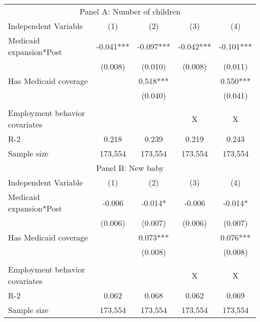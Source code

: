 \begin{tabular}{lcccc}
\toprule
\toprule
 \multicolumn{5}{c}{Panel A: Number of children } \\
 Independent Variable & (1) & (2) & (3) &  (4) \\
\midrule 
 Medicaid expansion*Post   & -0.041***   & -0.097***   & -0.042***   & -0.101***  \\
 & (0.008)   & (0.010)   & (0.008)   & (0.011)  \\
 Has Medicaid coverage   &   & 0.518***   &   & 0.550***  \\
 &    & (0.040)   &    & (0.041)  \\
\\
Employment behavior covariates  &  &  & X & X \\
R-2 & 0.218 & 0.239 & 0.219 & 0.243 \\
Sample size & 173,554 & 173,554 & 173,554 & 173,554 \\
\midrule
\midrule
 \multicolumn{5}{c}{Panel B: New baby } \\
 Independent Variable & (1) & (2) & (3) &  (4) \\
\midrule 
 Medicaid expansion*Post   & -0.006   & -0.014*   & -0.006   & -0.014*  \\
 & (0.006)   & (0.007)   & (0.006)   & (0.007)  \\
 Has Medicaid coverage   &   & 0.073***   &   & 0.076***  \\
 &    & (0.008)   &    & (0.008)  \\
\\
Employment behavior covariates  &  &  & X & X \\
R-2 & 0.062 & 0.068 & 0.062 & 0.069 \\
Sample size & 173,554 & 173,554 & 173,554 & 173,554 \\
\midrule
\midrule
\bottomrule
\end{tabular}